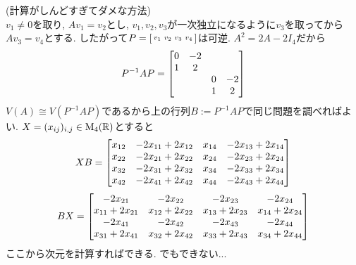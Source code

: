\begin{egans}
\begin{ans} (計算がしんどすぎてダメな方法)\\
$v_1\neq 0$を取り, $Av_1 = v_2$とし, $v_1,v_2,v_3$が一次独立になるように$v_3$を取ってから$Av_3 = v_4$とする.
したがって$P = \left[\begin{smallmatrix}v_1 & v_2  & v_3 & v_4\end{smallmatrix}\right]$は可逆. $A^2 = 2A - 2I_4$だから
\[P^{-1}AP = \begin{bmatrix} 0 &-2 & & \\ 1&2&& \\ &&0&-2 \\ &&1&2
\end{bmatrix}\]
$V(A)\cong V(P^{-1}AP)$であるから上の行列$B:=P^{-1}AP$で同じ問題を調べればよい. $X=(x_{ij})_{i,j}\in\mathrm{M}_{4}(\mathbb{R})$とすると
\[XB = \begin{bmatrix} x_{12} & -2x_{11} + 2x_{12} & x_{14} & -2x_{13} + 2x_{14} \\
x_{22}& -2x_{21} + 2x_{22}& x_{24} & -2x_{23} + 2x_{24}\\
x_{32} & -2x_{31} + 2x_{32} & x_{34} & -2x_{33} + 2x_{34} \\
x_{42}& -2x_{41} + 2x_{42}& x_{44} & -2x_{43} + 2x_{44}
\end{bmatrix}\]
\[BX = \begin{bmatrix} -2x_{21} & - 2x_{22} &-2x_{23}& - 2x_{24}\\
x_{11} + 2x_{21}& x_{12} + 2x_{22}& x_{13} + 2x_{23}& x_{14} + 2x_{24} \\
-2x_{41} & - 2x_{42} &-2x_{43}& - 2x_{44}\\
x_{31} + 2x_{41}& x_{32} + 2x_{42}& x_{33} + 2x_{43}& x_{34}+ 2x_{44} \\


\end{bmatrix}\]
ここから次元を計算すればできる. でもできない...
\end{ans}


\end{egans}
